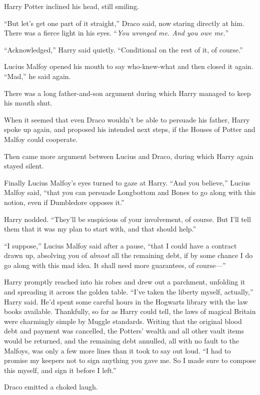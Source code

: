 Harry Potter inclined his head, still smiling.

“But let’s get one part of it straight,” Draco said, now staring directly at him. There was a fierce light in his eyes. “\emph{You wronged me. \emph{And} you owe me.}”

“Acknowledged,” Harry said quietly. “Conditional on the rest of it, of course.”

Lucius Malfoy opened his mouth to say who-knew-what and then closed it again. “Mad,” he said again.

There was a long father-and-son argument during which Harry managed to keep his mouth shut.

When it seemed that even Draco wouldn’t be able to persuade his father, Harry spoke up again, and proposed his intended next steps, if the Houses of Potter and Malfoy could cooperate.

Then came more argument between Lucius and Draco, during which Harry again stayed silent.

Finally Lucius Malfoy’s eyes turned to gaze at Harry. “And you believe,” Lucius Malfoy said, “that you can persuade Longbottom and Bones to go along with this notion, even if Dumbledore opposes it.”

Harry nodded. “They’ll be suspicious of your involvement, of course. But I’ll tell them that it was my plan to start with, and that should help.”

“I suppose,” Lucius Malfoy said after a pause, “that I could have a contract drawn up, absolving you of \emph{almost} all the remaining debt, if by some chance I do go along with this mad idea. It shall need more guarantees, of course—”

Harry promptly reached into his robes and drew out a parchment, unfolding it and spreading it across the golden table. “I’ve taken the liberty myself, actually,” Harry said. He’d spent some careful hours in the Hogwarts library with the law books available. Thankfully, so far as Harry could tell, the laws of magical Britain were charmingly simple by Muggle standards. Writing that the original blood debt and payment was cancelled, the Potters’ wealth and all other vault items would be returned, and the remaining debt annulled, all with no fault to the Malfoys, was only a few more lines than it took to say out loud. “I had to promise my keepers not to sign anything you gave me. So I made sure to compose this myself, and sign it before I left.”

Draco emitted a choked laugh.

